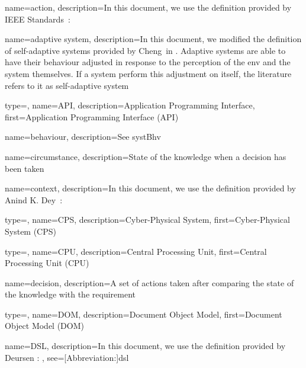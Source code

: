 {
	name={ac\-tion},
	description={In this document, we use the definition provided by IEEE Standards~\cite{iso2017systems}: }
}

{
	name={adaptive system},
	description={In this document, we modified the definition of self-adaptive systems provided by Cheng~\etal in \cite{DBLP:conf/dagstuhl/ChengLGIMABBBCSDFGGGKKKLMMMPSTTWW09}. Adaptive systems are able to have their \gls{behaviour} adjusted in response to the perception of the \gls{env} and the system themselves. If a system perform this adjustment on itself, the literature refers to it as self-adaptive system}
}

{
	type=\acronymtype,
	name={API},
	description={Application Programming Interface},
	first={Application Programming Interface (API)}
}

{
	name={be\-ha\-viour},
	description={See \gls{systBhv}}
}

{
	name={cir\-cums\-tance},
	description={State of the \gls{knowledge} when a \gls{decision} has been taken}
}

{
	name={con\-text},
	description={In this document, we use the definition provided by Anind K. Dey~\cite{DBLP:journals/puc/Dey01}: }
}

{
	type=\acronymtype,
	name={CPS},
	description={Cyber-Physical System},
	first={Cyber-Physical System (CPS)}
}

{
	type=\acronymtype,
	name={CPU},
	description={Central Processing Unit},
	first={Central Processing Unit (CPU)}
}

{
	name={de\-ci\-sion},
	description={A set of \glspl{action} taken after comparing the state of the \gls{knowledge} with the \gls{requirement}}
}

{
	type=\acronymtype,
	name={DOM},
	description={Document Object Model},
	first={Document Object Model (DOM)}
}

{
	name={DSL},
	description={In this document, we use the definition provided by Deursen \etal \cite{DBLP:journals/sigplan/DeursenKV00}: },
	see=[Abbreviation:]{dsl}
}

